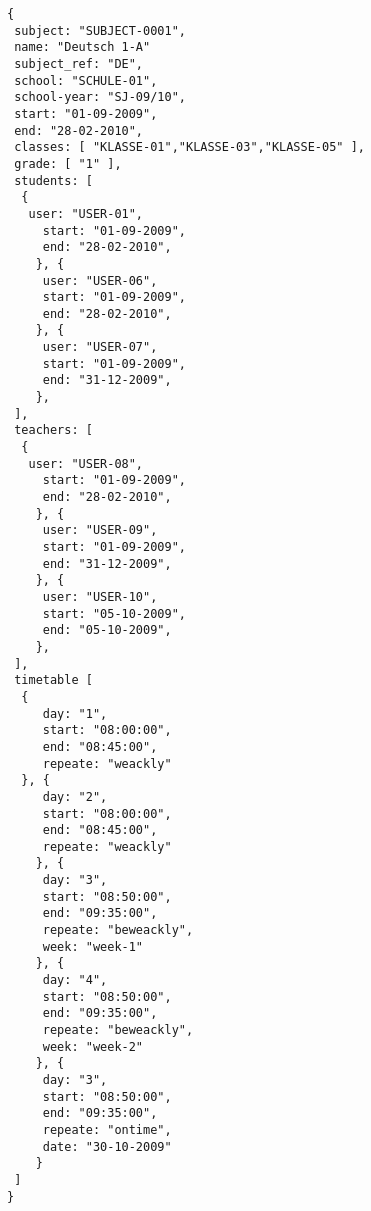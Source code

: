 
\begin{lstlisting}[caption={Beispiel 1 Schüler},frame=tlrb]
{
 subject: "SUBJECT-0001",
 name: "Deutsch 1-A"
 subject_ref: "DE",
 school: "SCHULE-01",
 school-year: "SJ-09/10",
 start: "01-09-2009",
 end: "28-02-2010",
 classes: [ "KLASSE-01","KLASSE-03","KLASSE-05" ],
 grade: [ "1" ],
 students: [
  { 
   user: "USER-01",
	 start: "01-09-2009",
	 end: "28-02-2010",
	}, { 
	 user: "USER-06",
	 start: "01-09-2009",
	 end: "28-02-2010",
	}, { 
	 user: "USER-07",
	 start: "01-09-2009",
	 end: "31-12-2009",
	},
 ],
 teachers: [
  { 
   user: "USER-08",
	 start: "01-09-2009",
	 end: "28-02-2010",
	}, { 
	 user: "USER-09",
	 start: "01-09-2009",
	 end: "31-12-2009",
	}, { 
	 user: "USER-10",
	 start: "05-10-2009",
	 end: "05-10-2009",
	},
 ],
 timetable [
  {
	 day: "1",
	 start: "08:00:00",
	 end: "08:45:00",
	 repeate: "weackly"
  }, {
	 day: "2",
	 start: "08:00:00",
	 end: "08:45:00",
	 repeate: "weackly"
	}, {
	 day: "3",
	 start: "08:50:00",
	 end: "09:35:00",
	 repeate: "beweackly",
	 week: "week-1"
	}, {
	 day: "4",
	 start: "08:50:00",
	 end: "09:35:00",
	 repeate: "beweackly",
	 week: "week-2"
	}, {
	 day: "3",
	 start: "08:50:00",
	 end: "09:35:00",
	 repeate: "ontime",
	 date: "30-10-2009"
	}	 
 ]
}
\end{lstlisting}